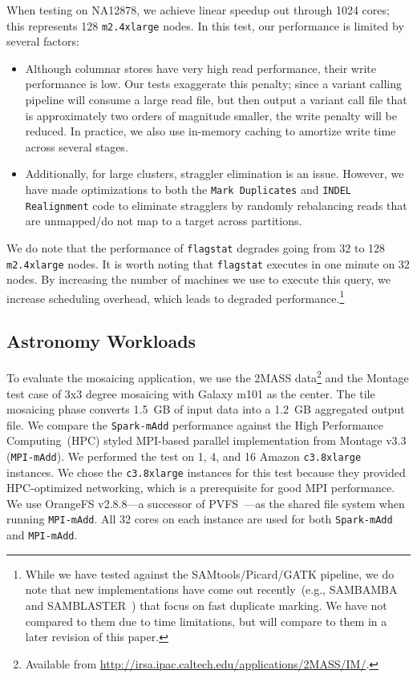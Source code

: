 \documentclass{acm_proc_article-sp}
\begin{document}
When testing on NA12878, we achieve linear speedup out through 1024 cores; this represents 128
\texttt{m2.4xlarge} nodes. In this test, our performance is limited by several factors:

\begin{itemize}
\item Although columnar stores have very high read performance, their write performance is low. Our
tests exaggerate this penalty; since a variant calling pipeline will consume a large read file, but then output a
variant call file that is approximately two orders of magnitude smaller, the write penalty will be reduced. In
practice, we also use in-memory caching to amortize write time across several stages.
\item Additionally, for large clusters, straggler elimination is an issue. However, we have made optimizations to
both the \texttt{Mark Duplicates} and \texttt{INDEL Realignment} code to eliminate stragglers by randomly
rebalancing reads that are unmapped/do not map to a target across partitions.
\end{itemize}

We do note that the performance of \texttt{flagstat} degrades going from 32 to 128 \texttt{m2.4xlarge} nodes.
It is worth noting that \texttt{flagstat} executes in one minute on 32 nodes. By increasing the number of machines
we use to execute this query, we increase scheduling overhead, which leads to degraded
performance.\footnote{While we
have tested against the SAMtools/Picard/GATK pipeline, we do note that new implementations have come out
recently~(e.g., SAMBAMBA and SAMBLASTER~\cite{faust14}) that focus on fast duplicate marking. We have not
compared to them due to time limitations, but will compare to them in a later revision of this paper.}

\subsection{Astronomy Workloads}
\label{sec:astro-workloads}

To evaluate the mosaicing application, we use the 2MASS data\footnote{Available from
\url{http://irsa.ipac.caltech.edu/applications/2MASS/IM/}.} and the Montage test case of 3x3 degree
mosaicing with Galaxy m101 as the center. The tile mosaicing phase converts 1.5~GB of input data into a
1.2~GB aggregated output file. We compare the \texttt{Spark-mAdd} performance against the High Performance
Computing~(HPC) styled MPI-based parallel implementation from Montage v3.3 (\texttt{MPI-mAdd}). We
performed the test on 1, 4, and 16 Amazon \texttt{c3.8xlarge} instances. We chose the \texttt{c3.8xlarge} instances
for this test because they provided HPC-optimized networking, which is a prerequisite for good MPI performance.
We use OrangeFS v2.8.8---a successor of PVFS~\cite{PVFS}---as the shared file system when running
\texttt{MPI-mAdd}. All 32 cores on each instance are used for both \texttt{Spark-mAdd} and \texttt{MPI-mAdd}.
\end{document}
